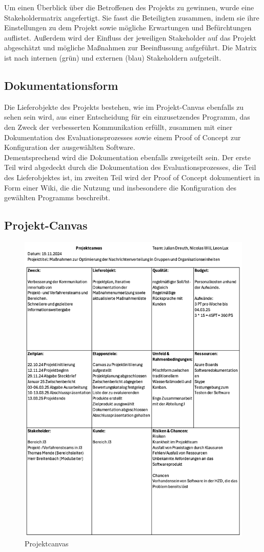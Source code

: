 \documentclass[ThesisDJ.tex]{subfiles}
\begin{document}
  Um einen Überblick über die Betroffenen des Projekts zu gewinnen, wurde eine Stakeholdermatrix angefertigt. Sie fasst die Beteiligten zusammen, indem sie ihre Einstellungen zu dem Projekt sowie mögliche Erwartungen und Befürchtungen auflistet. Außerdem wird der Einfluss der jeweiligen Stakeholder auf das Projekt abgeschätzt und mögliche Maßnahmen zur Beeinflussung aufgeführt. Die Matrix ist nach internen (grün) und externen (blau) Stakeholdern aufgeteilt. 

	
	\subsection{Dokumentationsform}
	
	Die Lieferobjekte des Projekts bestehen, wie im Projekt-Canvas ebenfalls zu sehen sein wird, aus einer Entscheidung für ein einzusetzendes Programm, das den Zweck der verbesserten Kommunikation erfüllt, zusammen mit einer Dokumentation des Evaluationsprozesses sowie einem Proof of Concept zur Konfiguration der ausgewählten Software.\\
	Dementsprechend wird die Dokumentation ebenfalls zweigeteilt sein. Der erste Teil wird abgedeckt durch die Dokumentation des Evaluationsprozesses, die Teil des Lieferobjektes ist, im zweiten Teil wird der Proof of Concept dokumentiert in Form einer Wiki, die die Nutzung und insbesondere die Konfiguration des gewählten Programms beschreibt. 
	
	\subsection{Projekt-Canvas}
  \begin{figure}
    \includegraphics[scale=0.5]{Projektcanvas.png}
    \centering
    \caption{Projektcanvas}
  \end{figure}
\end{document}
